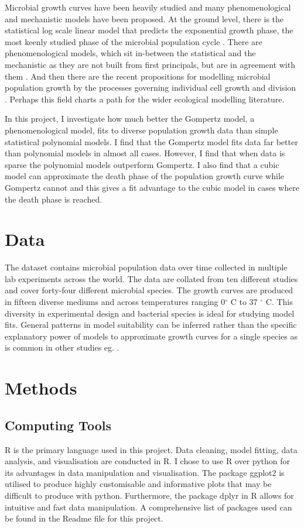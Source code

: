 \documentclass[11pt]{article}
\begin{document}
    Microbial growth curves have been heavily studied and many phenomenological and mechanistic models have been proposed. At the ground level, there is the statistical log scale linear model that predicts the exponential growth phase, the most keenly studied phase of the microbial population cycle \cite{Peleg2011}. There are phenomenological models, which sit in-between the statistical and the mechanistic as they are not built from first principals, but are in agreement with them \citep{Allen2018}. And then there are the recent propositions for modelling microbial population growth by the processes governing individual cell growth and division \citep{Jafarpour2019}. Perhaps this field charts a path for the wider ecological modelling literature.

    In this project, I investigate how much better the Gompertz model, a phenomenological model, fits to diverse population growth data than simple statistical polynomial models. I find that the Gompertz model fits data far better than polynomial models in almost all cases. However, I find that when data is sparse the polynomial models outperform Gompertz. I also find that a cubic model can approximate the death phase of the population growth curve while Gompertz cannot and this gives a fit advantage to the cubic model in cases where the death phase is reached.
  
  \section{Data}
  The dataset contains microbial population data over time collected in multiple lab experiments across the world.  The data are collated from ten different studies and cover forty-four different microbial species. The growth curves are produced in fifteen diverse mediums and across temperatures ranging 0$^{\circ}$ C to 37 $^{\circ}$ C. This diversity in experimental design and bacterial species is ideal for studying model fits. General patterns in model suitability can be inferred rather than the specific explanatory power of models to approximate growth curves for a single species as is common in other studies eg. \cite{Zwietering1990}.

  \section{Methods}
  \subsection{Computing Tools}
  R is the primary language used in this project. Data cleaning, model fitting, data analysis, and visualisation are conducted in R. I chose to use R over python for its advantages in data manipulation and visualisation. The package ggplot2 is utilised to produce highly customisable and informative plots that may be difficult to produce with python. Furthermore, the package dplyr in R allows for intuitive and fast data manipulation. A comprehensive list of packages used can be found in the Readme file for this project. 
  
\end{document}
